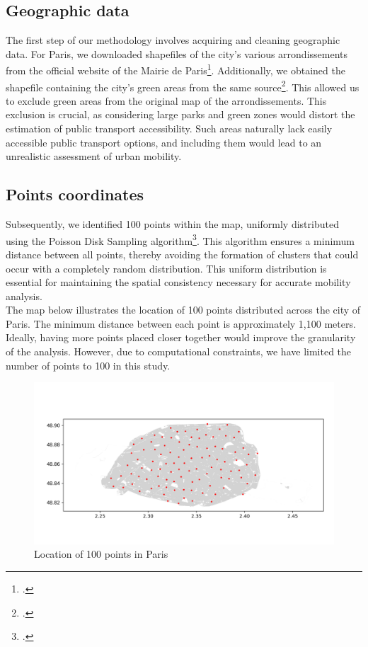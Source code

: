 \documentclass[a4paper,12pt]{article}
\begin{document}
\subsection{Geographic data}
The first step of our methodology involves acquiring and cleaning geographic data. For Paris, we downloaded shapefiles of the city's various arrondissements from the official website of the Mairie de Paris\footcite{paris_arrondissement}. Additionally, we obtained the shapefile containing the city's green areas from the same source\footcite{espaces_verts}. This allowed us to exclude green areas from the original map of the arrondissements. This exclusion is crucial, as considering large parks and green zones would distort the estimation of public transport accessibility. Such areas naturally lack easily accessible public transport options, and including them would lead to an unrealistic assessment of urban mobility.

\subsection{Points coordinates}

Subsequently, we identified 100 points within the map, uniformly distributed using the Poisson Disk Sampling algorithm\footcite{bridson2007}. This algorithm ensures a minimum distance between all points, thereby avoiding the formation of clusters that could occur with a completely random distribution. This uniform distribution is essential for maintaining the spatial consistency necessary for accurate mobility analysis.\\

The map below illustrates the location of 100 points distributed across the city of Paris. The minimum distance between each point is approximately 1,100 meters. Ideally, having more points placed closer together would improve the granularity of the analysis. However, due to computational constraints, we have limited the number of points to 100 in this study.

\begin{figure}[h!]
	\centering
	\includegraphics[width=1\textwidth]{images/coords.png}
	\caption{Location of 100 points in Paris}
	\label{fig:coords_points}
\end{figure}
\end{document}
